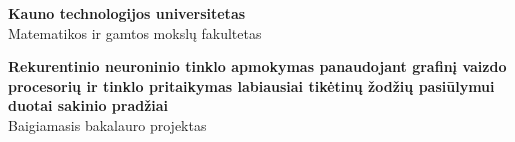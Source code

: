 

\begin{titlepage}
  \begin{center}


    \begin{figure}[H]
      \centering
    \end{figure}

    \vspace*{30pt}

    \fontXII
    \textbf{Kauno technologijos universitetas}\\
    Matematikos ir gamtos mokslų fakultetas

    \vspace*{100pt}

    \fontXVIII
	   \textbf{Rekurentinio neuroninio tinklo apmokymas panaudojant grafinį vaizdo procesorių ir tinklo pritaikymas labiausiai tikėtinų žodžių pasiūlymui duotai sakinio pradžiai}\\
     \fontXIV
     Baigiamasis bakalauro projektas

     \vspace*{76.8pt}

     \fontXII


\end{center}
\end{titlepage}
